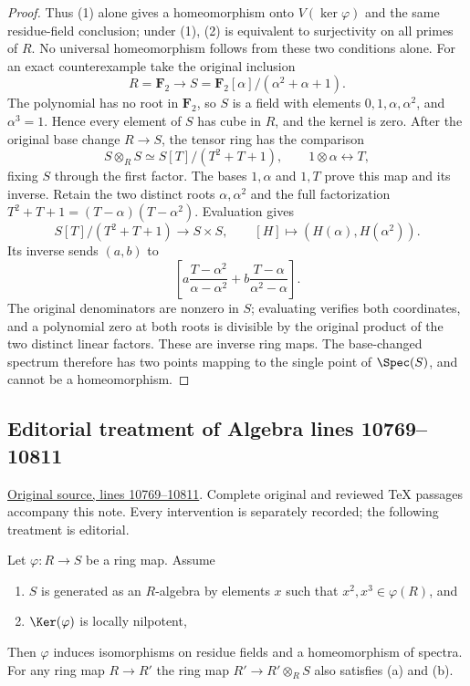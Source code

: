 \begin{proof}
Thus (1) alone gives a homeomorphism
onto $V(\ker\varphi)$ and the same
residue-field conclusion; under (1),
(2) is equivalent to surjectivity
on all primes of $R$. No universal
homeomorphism follows from these two
conditions alone. For an exact
counterexample take the original
inclusion
$$
R=\mathbf F_2\longrightarrow
S=\mathbf F_2[\alpha]/(\alpha^2+\alpha+1).
$$
The polynomial has no root in
$\mathbf F_2$, so $S$ is a field
with elements $0,1,\alpha,\alpha^2$,
and $\alpha^3=1$. Hence every
element of $S$ has cube in $R$,
and the kernel is zero. After the
original base change $R\to S$,
the tensor ring has the comparison
$$
S\otimes_R S\simeq S[T]/(T^2+T+1),
\qquad1\otimes\alpha\longleftrightarrow T,
$$
fixing $S$ through the first factor.
The bases $1,\alpha$ and $1,T$
prove this map and its inverse.
Retain the two distinct roots
$\alpha,\alpha^2$ and the full
factorization
$T^2+T+1=(T-\alpha)(T-\alpha^2)$.
Evaluation gives
$$
S[T]/(T^2+T+1)\longrightarrow S\times S,
\qquad[H]\longmapsto(H(\alpha),H(\alpha^2)).
$$
Its inverse sends $(a,b)$ to
$$
\left[
a\frac{T-\alpha^2}{\alpha-\alpha^2}
+b\frac{T-\alpha}{\alpha^2-\alpha}
\right].
$$
The original denominators are nonzero
in $S$; evaluating verifies both
coordinates, and a polynomial zero
at both roots is divisible by the
original product of the two distinct
linear factors. These are inverse
ring maps. The base-changed spectrum
therefore has two points mapping
to the single point of $\Spec(S)$,
and cannot be a homeomorphism.
\end{proof}


\subsection{Editorial treatment of Algebra lines 10769--10811}

\hypertarget{algebra-context-128}{}

\noindent\href{https://github.com/stacks/stacks-project/blob/a04446e57ec1fbc252a871afcec7752fb2807b14/algebra.tex\#L10769}{Original source, lines 10769--10811}. Complete original and reviewed TeX passages accompany this note. Every intervention is separately recorded; the following treatment is editorial.


\begin{lemma}
\label{editorial-source-lemma-2-3-ring-map}
Let $\varphi : R \to S$ be a ring map. Assume
\begin{enumerate}
\item[(a)] $S$ is generated as an $R$-algebra by elements $x$ such
that $x^2, x^3 \in \varphi(R)$, and
\item[(b)] $\Ker(\varphi)$ is locally nilpotent,
\end{enumerate}
Then $\varphi$ induces isomorphisms on residue fields and
a homeomorphism of spectra. For any ring map $R \to R'$
the ring map $R' \to R' \otimes_R S$ also satisfies (a) and (b).
\end{lemma}

